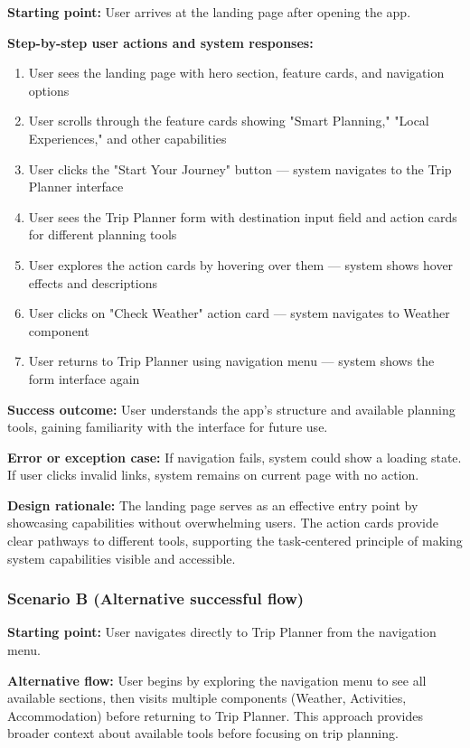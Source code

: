 \documentclass[11pt,a4paper]{article}
\begin{document}
\textbf{Starting point:} User arrives at the landing page after opening the app.

\textbf{Step-by-step user actions and system responses:}
\begin{enumerate}
\item User sees the landing page with hero section, feature cards, and navigation options
\item User scrolls through the feature cards showing "Smart Planning," "Local Experiences," and other capabilities
\item User clicks the "Start Your Journey" button — system navigates to the Trip Planner interface
\item User sees the Trip Planner form with destination input field and action cards for different planning tools
\item User explores the action cards by hovering over them — system shows hover effects and descriptions
\item User clicks on "Check Weather" action card — system navigates to Weather component
\item User returns to Trip Planner using navigation menu — system shows the form interface again
\end{enumerate}

\textbf{Success outcome:} User understands the app's structure and available planning tools, gaining familiarity with the interface for future use.

\textbf{Error or exception case:} If navigation fails, system could show a loading state. If user clicks invalid links, system remains on current page with no action.

\textbf{Design rationale:} The landing page serves as an effective entry point by showcasing capabilities without overwhelming users. The action cards provide clear pathways to different tools, supporting the task-centered principle of making system capabilities visible and accessible.

\subsubsection*{Scenario B (Alternative successful flow)}

\textbf{Starting point:} User navigates directly to Trip Planner from the navigation menu.

\textbf{Alternative flow:} User begins by exploring the navigation menu to see all available sections, then visits multiple components (Weather, Activities, Accommodation) before returning to Trip Planner. This approach provides broader context about available tools before focusing on trip planning.
\end{document}
